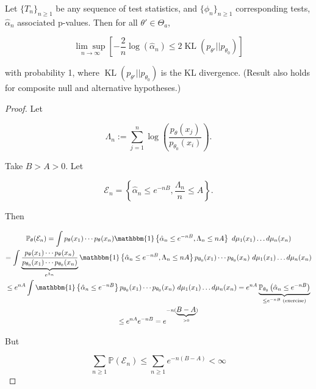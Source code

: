 \begin{theorem}

Let \(\{T_n\}_{n \geq 1}\) be any sequence of test statistics, and \(\{\phi_n\}_{n \geq 1}\) corresponding tests, \(\hat{\alpha}_n\) associated p-values. Then for all \(\theta' \in \Theta_a\), 

\[
\underset{n \to \infty}{\lim \sup} \left[ - \frac{2}{n} \log (\hat{\alpha}_n) \leq 2 \operatorname{KL}(p_{\theta'} || p_{\theta_0} )\right]
\]

with probability 1, where \(\operatorname{KL}(p_{\theta'} || p_{\theta_0} )\) is the KL divergence. (Result also holds for composite null and alternative hypotheses.)

\end{theorem}

\begin{proof}

Let 

\[
\Lambda_n := \sum_{j=1}^n \log \left( \frac{ p_\theta(x_j)}{p_{\theta_0}(x_i)} \right).
\]

Take \(B > A > 0\). Let

\[
\mathcal{E}_n = \left\{ \hat{\alpha}_n \leq e^{-n B}, \frac{\Lambda_n}{n} \leq A \right\}.
\]

Then

\begin{multline*}
\mathbb{P}_\theta ( \mathcal{E}_n) = \int p_\theta(x_1) \cdots p_\theta(x_n) \mathbbm{1} \left\{  \hat{\alpha}_n \leq e^{-n B}, \Lambda_n \leq n A \right\}\ d\mu_1(x_1) \ldots d \mu_n(x_n)
\\ =  \int  \underbrace{\frac{p_\theta(x_1) \cdots p_\theta(x_n)}{p_{\theta_0}(x_1) \cdots p_{\theta_0}(x_n)}}_{e^{\Lambda_n}} \mathbbm{1} \left\{  \hat{\alpha}_n \leq e^{-n B}, \Lambda_n \leq n A \right\} p_{\theta_0}(x_1) \cdots p_{\theta_0}(x_n) \ d\mu_1(x_1) \ldots d \mu_n(x_n)
\\ \leq   e^{nA}  \int   \mathbbm{1} \left\{  \hat{\alpha}_n \leq e^{-n B} \right\} p_{\theta_0}(x_1) \cdots p_{\theta_0}(x_n) \ d\mu_1(x_1) \ldots d \mu_n(x_n)
 = e^{nA}  \underbrace{\mathbb{P}_{\theta_0} \left (\hat{\alpha}_n \leq e^{-nB} \right)}_{\leq e^{-nB} \text{ (exercise)}} 
\\ \leq e^{nA} e^{-nB} = e^{-n(\underbrace{B-A}_{>0})}
\end{multline*}

But


\[
\sum_{n \geq 1} \mathbb{P}(\mathcal{E}_n) \leq \sum_{n \geq 1} e^{-n(B-A)} < \infty
\]


\end{proof}
